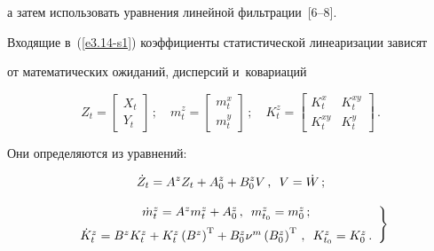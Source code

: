 а затем использовать уравнения линейной фильтрации~[6--8]. %

Входящие в~(\ref{e3.14-s1}) коэффициенты статистической линеаризации зависят 

от математических ожиданий, дисперсий и~ковариаций

    $$

    Z_t =\begin{bmatrix}

     X_t\\ 

     Y_t\end{bmatrix}\,; \quad 

     m_t^z =\begin{bmatrix} 

     m_t^x\\[9pt] 

     m_t^y\end{bmatrix}\,;\quad 

     K_t^z=\begin{bmatrix}

      K_t^x&K_t^{xy}\\[9pt] 

      K_t^{xy}&K_t^y\end{bmatrix}\,.

      $$

Они определяются из уравнений:

$$

\dot Z_t = A^z Z_t + A_0^z + B_0^z V\, ,\enskip V= \dot W\,; %

$$

\begin{equation}

\left.

\begin{array}{c}

\dot m_t^z = A^z m_t^z + A_0^z \,,\enskip m_{t_0}^z = m_0^z\,;\\[6pt]

\dot K_t^z = B^z K_t^z + K_t^z \left(B^z\right)^{\mathrm{T}} + B_0^z \nu^m \left(B_0^z\right)^{\mathrm{T}}\,,

\enskip K_{t_0}^z = K_0^z\,. %

\end{array}

\right\}

\label{e3.16-s1}

\end{equation}

